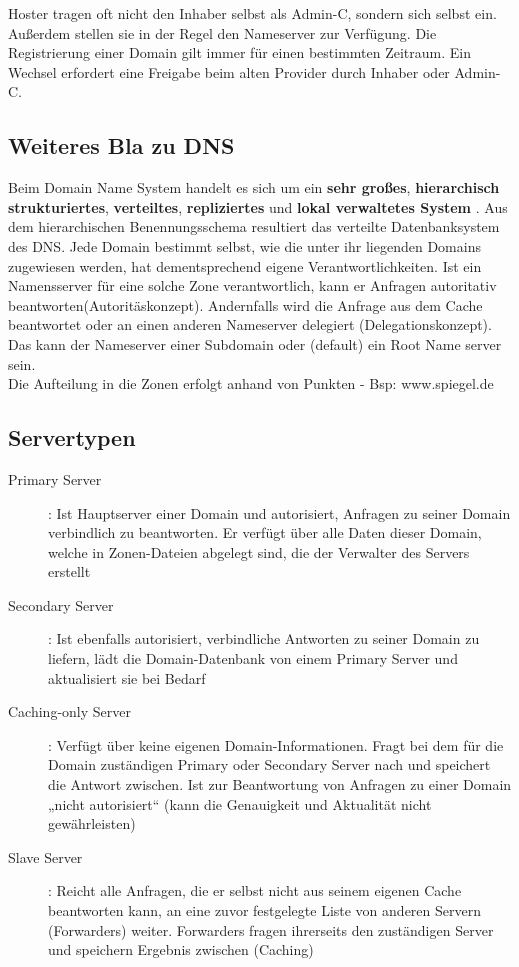 \documentclass{article} %
\begin{document}
Hoster tragen oft nicht den Inhaber selbst als Admin-C, sondern sich selbst ein.
Außerdem stellen sie in der Regel den Nameserver zur Verfügung.
Die Registrierung einer Domain gilt immer für einen bestimmten Zeitraum.
Ein Wechsel erfordert eine Freigabe beim alten Provider durch Inhaber oder Admin-C.

\subsection{Weiteres Bla zu DNS}

Beim Domain Name System handelt es sich um ein \textbf{sehr großes}, \textbf{hierarchisch strukturiertes}, \textbf{verteiltes}, \textbf{repliziertes} und \textbf{lokal verwaltetes System} \cite{rfc1034,rfc1035}.
Aus dem hierarchischen Benennungsschema resultiert das verteilte Datenbanksystem des DNS.
Jede Domain bestimmt selbst, wie die unter ihr liegenden Domains zugewiesen werden, hat dementsprechend eigene Verantwortlichkeiten.
Ist ein Namensserver für eine solche Zone verantwortlich, kann er Anfragen autoritativ beantworten(Autoritäskonzept).
Andernfalls wird die Anfrage aus dem Cache beantwortet oder an einen anderen Nameserver delegiert (Delegationskonzept).
Das kann der Nameserver einer Subdomain oder (default) ein Root Name server sein.\\
Die Aufteilung in die Zonen erfolgt anhand von Punkten - Bsp: www.spiegel.de

\subsection{Servertypen}

\begin{description}
\item[Primary Server]: Ist Hauptserver einer Domain und autorisiert, Anfragen zu seiner Domain verbindlich zu
beantworten.
Er verfügt über alle Daten dieser Domain, welche in Zonen-Dateien abgelegt sind, die der Verwalter des
Servers erstellt
\item[Secondary Server]: Ist ebenfalls autorisiert, verbindliche Antworten zu seiner
Domain zu liefern, lädt die Domain-Datenbank von einem Primary Server und aktualisiert sie bei Bedarf
\item[Caching-only Server]: Verfügt über keine eigenen Domain-Informationen.
Fragt bei dem für die Domain zuständigen Primary oder Secondary Server nach und speichert die Antwort zwischen.
Ist zur Beantwortung von Anfragen zu einer Domain „nicht autorisiert“ (kann die Genauigkeit und Aktualität nicht gewährleisten)
\item[Slave	Server]: Reicht alle Anfragen, die er selbst nicht aus seinem eigenen Cache beantworten kann, an eine zuvor festgelegte Liste von anderen Servern (Forwarders) weiter.
Forwarders fragen ihrerseits den zuständigen Server und speichern Ergebnis zwischen (Caching)
\end{description}
\end{document}
